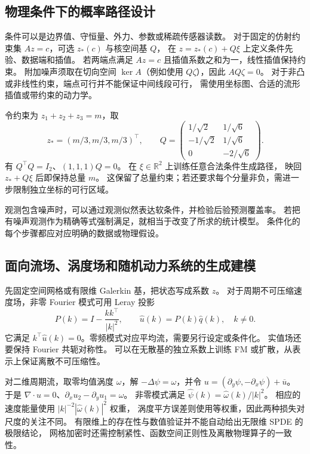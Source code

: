 \subsection{物理条件下的概率路径设计}

条件可以是边界值、守恒量、外力、参数或稀疏传感器读数。
对于固定的仿射约束集 \(Az=c\)，可选 \(z_*(c)\) 与核空间基 \(Q\)，
在 \(z=z_*(c)+Q\xi\) 上定义条件先验、数据端和插值。
若两端点满足 \(Az=c\) 且插值系数之和为一，线性插值保持约束。
附加噪声须取在切向空间 \(\ker A\)（例如使用 \(Q\zeta\)），因此 \(A Q\zeta=0\)。
对于非凸或非线性约束，端点可行并不能保证中间线段可行，
需使用坐标图、合适的流形插值或带约束的动力学。

\begin{example}[固定总量的三维状态]
令约束为 \(z_1+z_2+z_3=m\)，取
\[
 z_*=(m/3,m/3,m/3)^\top,\qquad
 Q=\begin{pmatrix}
 1/\sqrt2&1/\sqrt6\\-1/\sqrt2&1/\sqrt6\\0&-2/\sqrt6
 \end{pmatrix}.
\]
有 \(Q^\top Q=I_2\)、\((1,1,1)Q=0\)。
在 \(\xi\in\mathbb R^2\) 上训练任意合法条件生成路径，
映回 \(z_*+Q\xi\) 后即保持总量 \(m\)。
这保留了总量约束；若还要求每个分量非负，需进一步限制独立坐标的可行区域。
\end{example}

观测包含噪声时，可以通过观测似然表达软条件，并检验后验预测覆盖率。
若把有噪声观测作为精确等式强制满足，就相当于改变了所求的统计模型。
条件化的每个步骤都应对应明确的数据或物理假设。

\subsection{面向流场、涡度场和随机动力系统的生成建模}

先固定空间网格或有限维 Galerkin 基，把状态写成系数 \(z\)。
对于周期不可压缩速度场，非零 Fourier 模式可用 Leray 投影
\begin{equation}
 P(k)=I-\frac{kk^\top}{|k|^2},\qquad
 \widehat u(k)=P(k)\widehat q(k),\quad k\ne0.
 \label{eq:unified-leray}
\end{equation}
它满足 \(k^\top\widehat u(k)=0\)。零频模式对应平均流，需要另行设定或条件化。
实值场还要保持 Fourier 共轭对称性。
可以在无散基的独立系数上训练 FM 或扩散，从表示上保证离散不可压缩性。

对二维周期流，取零均值涡度 \(\omega\)，解
\(-\Delta\psi=\omega\)，并令
\(u=(\partial_y\psi,-\partial_x\psi)+\overline u\)。
于是 \(\nabla\cdot u=0\)、\(\partial_xu_2-\partial_yu_1=\omega\)。
非零模式满足
\(\widehat\psi(k)=\widehat\omega(k)/|k|^2\)。
相应的速度能量使用 \(|k|^{-2}|\widehat\omega(k)|^2\) 权重，
涡度平方误差则使用等权重，因此两种损失对尺度的关注不同。
有限维上的存在性与数值验证并不能自动给出无限维 SPDE 的极限结论，
网格加密时还需控制紧性、函数空间正则性及离散物理算子的一致性。


